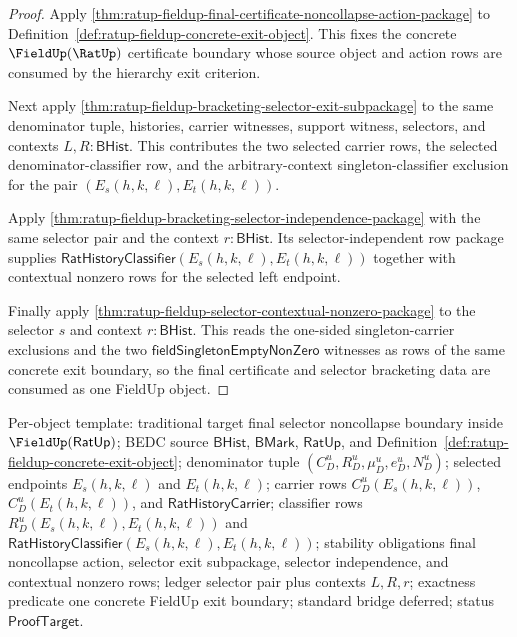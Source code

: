\begin{proof}
Apply \autoref{thm:ratup-fieldup-final-certificate-noncollapse-action-package}
to Definition~\ref{def:ratup-fieldup-concrete-exit-object}. This fixes the
concrete $\FieldUp(\RatUp)$ certificate boundary whose source object and action
rows are consumed by the hierarchy exit criterion.

Next apply \autoref{thm:ratup-fieldup-bracketing-selector-exit-subpackage} to
the same denominator tuple, histories, carrier witnesses, support witness,
selectors, and contexts $L,R:\mathsf{BHist}$. This contributes the two selected
carrier rows, the selected denominator-classifier row, and the arbitrary-context
singleton-classifier exclusion for the pair
$(E_s(h,k,\ell),E_t(h,k,\ell))$.

Apply \autoref{thm:ratup-fieldup-bracketing-selector-independence-package} with
the same selector pair and the context $r:\mathsf{BHist}$. Its
selector-independent row package supplies
$\mathsf{RatHistoryClassifier}(E_s(h,k,\ell),E_t(h,k,\ell))$ together with
contextual nonzero rows for the selected left endpoint.

Finally apply \autoref{thm:ratup-fieldup-selector-contextual-nonzero-package} to
the selector $s$ and context $r:\mathsf{BHist}$. This reads the one-sided
singleton-carrier exclusions and the two
$\mathsf{fieldSingletonEmptyNonZero}$ witnesses as rows of the same concrete
exit boundary, so the final certificate and selector bracketing data are
consumed as one FieldUp object.
\end{proof}

Per-object template: traditional target final selector noncollapse boundary
inside $\FieldUp(\mathsf{RatUp})$; BEDC source $\mathsf{BHist}$,
$\mathsf{BMark}$, $\mathsf{RatUp}$, and
Definition~\ref{def:ratup-fieldup-concrete-exit-object}; denominator tuple
$(C_D^u,R_D^u,\mu_D^u,e_D^u,N_D^u)$; selected endpoints
$E_s(h,k,\ell)$ and $E_t(h,k,\ell)$; carrier rows $C_D^u(E_s(h,k,\ell))$,
$C_D^u(E_t(h,k,\ell))$, and $\mathsf{RatHistoryCarrier}$; classifier rows
$R_D^u(E_s(h,k,\ell),E_t(h,k,\ell))$ and
$\mathsf{RatHistoryClassifier}(E_s(h,k,\ell),E_t(h,k,\ell))$; stability
obligations final noncollapse action, selector exit subpackage, selector
independence, and contextual nonzero rows; ledger selector pair plus contexts
$L,R,r$; exactness predicate one concrete FieldUp exit boundary; standard bridge
deferred; status $\mathsf{ProofTarget}$.
